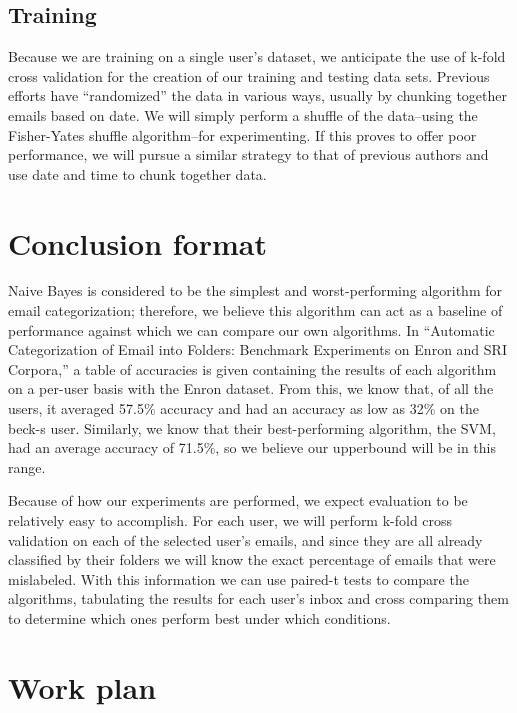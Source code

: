 \documentclass[11pt]{article}
\begin{document}
\subsection{Training}
\label{sec-4-3}


Because we are training on a single user’s dataset, we anticipate the use of k-fold cross validation for the creation of our training and testing data sets. Previous efforts have “randomized” the data in various ways, usually by chunking together emails based on date. We will simply perform a shuffle of the data--using the Fisher-Yates shuffle algorithm--for experimenting. If this proves to offer poor performance, we will pursue a similar strategy to that of previous authors and use date and time to chunk together data.


\section{Conclusion format}
\label{sec-5}

Naive Bayes is considered to be the simplest and worst-performing algorithm for email categorization; therefore, we believe this algorithm can act as a baseline of performance against which we can compare our own algorithms. In “Automatic Categorization of Email into Folders: Benchmark Experiments on Enron and SRI Corpora,” a table of accuracies is given containing the results of each algorithm on a per-user basis with the Enron dataset. From this, we know that, of all the users, it averaged 57.5\% accuracy and had an accuracy as low as 32\% on the beck-s user. Similarly, we know that their best-performing algorithm, the SVM, had an average accuracy of 71.5\%, so we believe our upperbound will be in this range.

Because of how our experiments are performed, we expect evaluation to be relatively easy to accomplish. For each user, we will perform k-fold cross validation on each of the selected user's emails, and since they are all already classified by their folders we will know the exact percentage of emails that were mislabeled. With this information we can use paired-t tests to compare the algorithms, tabulating the results for each user’s inbox and cross comparing them to determine which ones perform best under which conditions.

\section{Work plan}
\label{sec-6}
\end{document}
